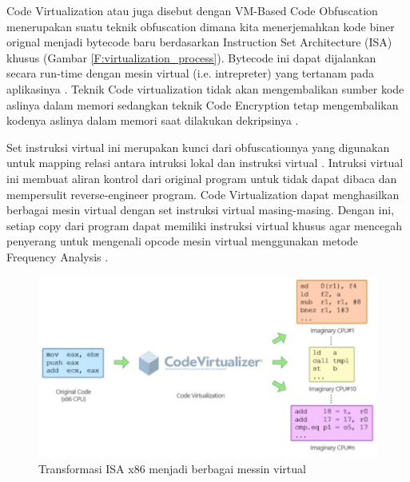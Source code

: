 Code Virtualization atau juga disebut dengan VM-Based Code Obfuscation menerupakan suatu teknik obfuscation dimana kita menerjemahkan kode biner orignal menjadi bytecode baru berdasarkan Instruction Set Architecture (ISA) khusus (Gambar \ref{F:virtualization_process}). Bytecode ini dapat dijalankan secara run-time dengan mesin virtual (i.e. intrepreter) yang tertanam pada aplikasinya \cite{Ore06,Zho24}. Teknik Code virtualization tidak akan mengembalikan sumber kode aslinya dalam memori sedangkan teknik Code Encryption tetap mengembalikan kodenya aslinya dalam memori saat dilakukan dekripsinya \cite{Don20}.

Set instruksi virtual ini merupakan kunci dari obfuscationnya yang digunakan untuk mapping relasi antara intruksi lokal dan instruksi virtual \cite{Zho24} . Intruksi virtual ini membuat aliran kontrol dari original program untuk tidak dapat dibaca dan mempersulit reverse-engineer program. Code Virtualization dapat menghasilkan berbagai mesin virtual dengan set instruksi virtual masing-masing. Dengan ini, setiap copy dari program dapat memiliki instruksi virtual khusus agar mencegah penyerang untuk mengenali opcode mesin virtual menggunakan metode Frequency Analysis \cite{Ore06,Zho24}.

\begin{figure}
	\centering
	\includegraphics[width=1\textwidth]
	{assets/pics/multiple_virtualization.jpg}
	\caption{Transformasi ISA x86 menjadi berbagai messin virtual \cite{Ore06}}
\end{figure}

